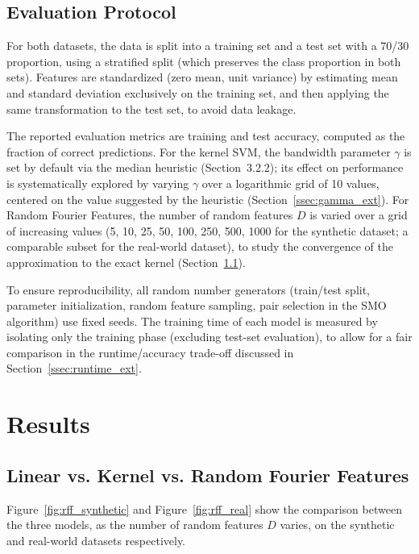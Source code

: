 \documentclass{article}
\begin{document}
\subsection{Evaluation Protocol}

For both datasets, the data is split into a training set and a test set with a 70/30 proportion, using a stratified split (which preserves the class proportion in both sets). Features are standardized (zero mean, unit variance) by estimating mean and standard deviation exclusively on the training set, and then applying the same transformation to the test set, to avoid data leakage.

The reported evaluation metrics are training and test accuracy, computed as the fraction of correct predictions. For the kernel SVM, the bandwidth parameter $\gamma$ is set by default via the median heuristic (Section~3.2.2); its effect on performance is systematically explored by varying $\gamma$ over a logarithmic grid of 10 values, centered on the value suggested by the heuristic (Section~\ref{ssec:gamma_ext}). For Random Fourier Features, the number of random features $D$ is varied over a grid of increasing values (5, 10, 25, 50, 100, 250, 500, 1000 for the synthetic dataset; a comparable subset for the real-world dataset), to study the convergence of the approximation to the exact kernel (Section~\ref{ssec:main_results}).

To ensure reproducibility, all random number generators (train/test split, parameter initialization, random feature sampling, pair selection in the SMO algorithm) use fixed seeds. The training time of each model is measured by isolating only the training phase (excluding test-set evaluation), to allow for a fair comparison in the runtime/accuracy trade-off discussed in Section~\ref{ssec:runtime_ext}.

\section{Results}

\subsection{Linear vs. Kernel vs. Random Fourier Features}
\label{ssec:main_results}

Figure~\ref{fig:rff_synthetic} and Figure~\ref{fig:rff_real} show the comparison between the three models, as the number of random features $D$ varies, on the synthetic and real-world datasets respectively.
\end{document}
